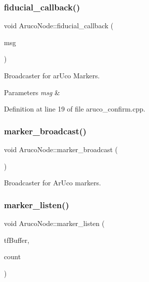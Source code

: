 \subsubsection{\texorpdfstring{fiducial\+\_\+callback()}{fiducial\_callback()}}
{\footnotesize\ttfamily void Aruco\+Node\+::fiducial\+\_\+callback (\begin{DoxyParamCaption}\item[{const fiducial\+\_\+msgs\+::\+Fiducial\+Transform\+Array\+::\+Const\+Ptr \&}]{msg }\end{DoxyParamCaption})}



Broadcaster for ar\+Uco Markers. 


\begin{DoxyParams}{Parameters}
{\em msg} & \\
\hline
\end{DoxyParams}


Definition at line 19 of file aruco\+\_\+confirm.\+cpp.

\mbox{\label{class_aruco_node_adb4d7fb3af40cb83ae69be077c589558}} 
\subsubsection{\texorpdfstring{marker\+\_\+broadcast()}{marker\_broadcast()}}
{\footnotesize\ttfamily void Aruco\+Node\+::marker\+\_\+broadcast (\begin{DoxyParamCaption}{ }\end{DoxyParamCaption})}



Broadcaster for Ar\+Uco markers. 

\mbox{\label{class_aruco_node_ad79fd951057c9a40f34fc159363fbd94}} 
\subsubsection{\texorpdfstring{marker\+\_\+listen()}{marker\_listen()}}
{\footnotesize\ttfamily void Aruco\+Node\+::marker\+\_\+listen (\begin{DoxyParamCaption}\item[{tf2\+\_\+ros\+::\+Buffer \&}]{tf\+Buffer,  }\item[{int}]{count }\end{DoxyParamCaption})}



